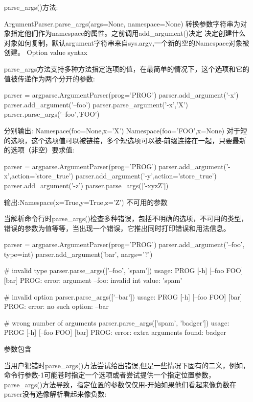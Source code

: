 parse\_args()方法:\par
ArgumentParser.parse\_args(args=None, namespace=None)
转换参数字符串为对象指定他们作为namespace的属性。之前调用add\_argument()决定
决定创建什么对象如何复制，默认argument字符串来自sys.argv,一个新的空的Namespace对象被创建。
Option value syntax\par
parse\_args方法支持多种方法指定选项的值，在最简单的情况下，这个选项和它的值被传递作为两个分开的参数:
\begin{python}
parser = argparse.ArgumentParser(prog='PROG')
parser.add_argument('-x')
parser.add_argument('--foo')
parser.parse_argument('-x','X')
parser.parse_args('--foo','FOO')
\end{python}
分别输出:\newline
Namespace(foo=None,x='X')\newline
Namespace(foo='FOO',x=None)\newline
对于短的选项，这个选项值可以被链接，多个短选项可以被-前缀连接在一起，只要最新的选项（非空）要求值:
\begin{python}
parser = argparse.ArgumentParser(prog='PROG')
parser.add_argument('-x',action='store_true')
parser.add_argument('-y',action='store_true')
parser.add_argument('-z')
parser.parse_args(['-xyzZ'])
\end{python}
输出:Namespace(x=True,y=True,z='Z')
不可用的参数\par
当解析命令行时parse\_args()检查多种错误，包括不明确的选项，不可用的类型，错误的参数为值等等，当出现一个错误，它推出同时打印错误和用法信息。
\begin{python}
parser = argparse.ArgumentParser(prog='PROG')
parser.add_argument('--foo', type=int)
parser.add_argument('bar', nargs='?')

# invalid type
parser.parse_args(['--foo', 'spam'])
usage: PROG [-h] [--foo FOO] [bar]
PROG: error: argument --foo: invalid int value: 'spam'

# invalid option
parser.parse_args(['--bar'])
usage: PROG [-h] [--foo FOO] [bar]
PROG: error: no such option: --bar

# wrong number of arguments
parser.parse_args(['spam', 'badger'])
usage: PROG [-h] [--foo FOO] [bar]
PROG: error: extra arguments found: badger
\end{python}
参数包含\par
当用户犯错时parse\_args()方法尝试给出错误,但是一些情况下固有的二义，例如，命令行参数-1可能苍时指定一个选项或者尝试提供一个指定位置参数，parse\_args()方法导致，指定位置的参数仅仅用-开始如果他们看起来像负数在parser没有选像解析看起来像负数:
